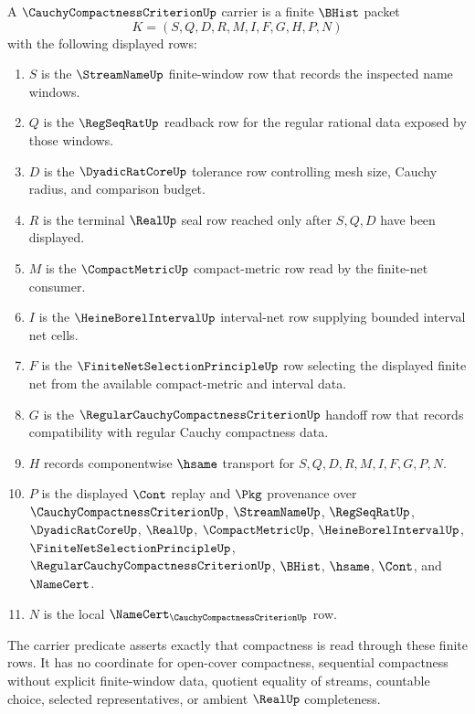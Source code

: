 \begin{definition}
\label{def:cauchy-compactness-criterion-carrier}
A $\CauchyCompactnessCriterionUp$ carrier is a finite $\BHist$ packet
$$
K=(S,Q,D,R,M,I,F,G,H,P,N)
$$
with the following displayed rows:
\begin{enumerate}
\item $S$ is the $\StreamNameUp$ finite-window row that records the inspected name windows.
\item $Q$ is the $\RegSeqRatUp$ readback row for the regular rational data exposed by those windows.
\item $D$ is the $\DyadicRatCoreUp$ tolerance row controlling mesh size, Cauchy radius, and comparison budget.
\item $R$ is the terminal $\RealUp$ seal row reached only after $S,Q,D$ have been displayed.
\item $M$ is the $\CompactMetricUp$ compact-metric row read by the finite-net consumer.
\item $I$ is the $\HeineBorelIntervalUp$ interval-net row supplying bounded interval net cells.
\item $F$ is the $\FiniteNetSelectionPrincipleUp$ row selecting the displayed finite net from the available compact-metric and interval data.
\item $G$ is the $\RegularCauchyCompactnessCriterionUp$ handoff row that records compatibility with regular Cauchy compactness data.
\item $H$ records componentwise $\hsame$ transport for $S,Q,D,R,M,I,F,G,P,N$.
\item $P$ is the displayed $\Cont$ replay and $\Pkg$ provenance over $\CauchyCompactnessCriterionUp$, $\StreamNameUp$, $\RegSeqRatUp$, $\DyadicRatCoreUp$, $\RealUp$, $\CompactMetricUp$, $\HeineBorelIntervalUp$, $\FiniteNetSelectionPrincipleUp$, $\RegularCauchyCompactnessCriterionUp$, $\BHist$, $\hsame$, $\Cont$, and $\NameCert$.
\item $N$ is the local $\NameCert_{\CauchyCompactnessCriterionUp}$ row.
\end{enumerate}
The carrier predicate asserts exactly that compactness is read through these finite rows. It has no coordinate for open-cover compactness, sequential compactness without explicit finite-window data, quotient equality of streams, countable choice, selected representatives, or ambient $\RealUp$ completeness.
\end{definition}

